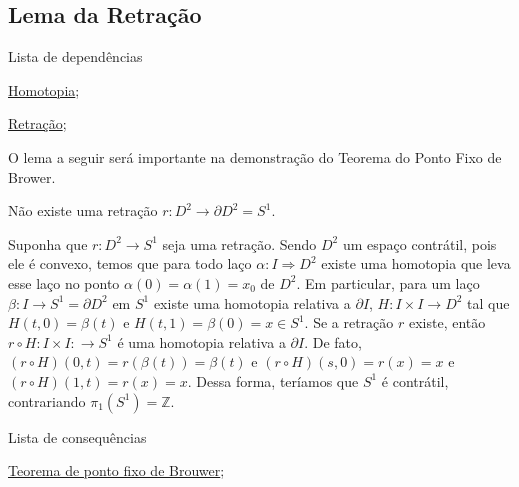 \subsection{Lema da Retração} %
\label{lema-retração}
\begin{titlemize}{Lista de dependências}
	\item \hyperref[homotopia]{Homotopia};\\ %
	\item \hyperref[retração-def]{Retração};\\
\end{titlemize}
O lema a seguir será importante na demonstração do Teorema do Ponto Fixo de Brower.
\begin{lemma}[Lema da Retração]%
	Não existe uma retração $r:D^2 \longrightarrow \partial D^2 = S^1$.
\end{lemma}

\begin{dem}
Suponha que $r:D^2 \longrightarrow S^1$ seja uma retração. Sendo $D^2$ um espaço contrátil, pois ele é convexo, temos que para todo laço $\alpha: I \Longrightarrow D^2$ existe uma homotopia que leva esse laço no ponto $\alpha(0) = \alpha(1) = x_0$ de $D^2$. Em particular, para um laço $\beta: I \longrightarrow S^1 = \partial D^2$ em $S^1$ existe uma homotopia relativa a $\partial I$, $H: I\times I \longrightarrow D^2$ tal que $H(t, 0) = \beta(t)$ e $H(t, 1) = \beta(0) = x \in S^1$. Se a retração $r$ existe, então $r\circ H: I\times I: \longrightarrow S^1$ é uma homotopia relativa a $\partial I$. De fato, $(r\circ H)(0, t) = r(\beta(t)) = \beta(t)$ e $(r\circ H)(s, 0) = r(x) = x$ e $(r\circ H)(1, t) = r(x) = x$. Dessa forma, teríamos que $S^1$ é contrátil, contrariando $\pi_1(S^1) = \mathbb{Z}$.
\end{dem}

\begin{titlemize}{Lista de consequências}
	\item \hyperref[teo-ponto-fixo-brower]{Teorema de ponto fixo de Brouwer};\\ %
\end{titlemize}

